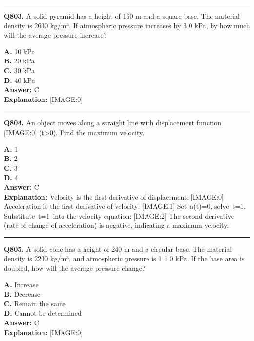 \documentclass[12pt]{article}
\begin{document}
\hrule
\vspace{1em}


\noindent
\textbf{Q803.} A solid pyramid has a height of 160 m and a square base. The material density is 2600 kg/m³. If atmospheric pressure increases by
3
0 kPa, by how much will the average pressure increase?



\textbf{A.} 10 kPa \\
\textbf{B.} 20 kPa \\
\textbf{C.} 30 kPa \\
\textbf{D.} 40 kPa \\

\textbf{Answer:} C \\
\textbf{Explanation:} [IMAGE:0]

\hrule
\vspace{1em}


\noindent
\textbf{Q804.} An object moves along a straight line with displacement function
[IMAGE:0]
(t>0). Find the maximum velocity.



\textbf{A.} 1 \\
\textbf{B.} 2 \\
\textbf{C.} 3 \\
\textbf{D.} 4 \\

\textbf{Answer:} C \\
\textbf{Explanation:} Velocity is the first derivative of displacement:
[IMAGE:0]
Acceleration is the first derivative of velocity:
[IMAGE:1]
Set a(t)=0, solve t=1. Substitute t=1 into the velocity equation:
[IMAGE:2]
The second derivative (rate of change of acceleration) is negative, indicating a maximum velocity.

\hrule
\vspace{1em}


\noindent
\textbf{Q805.} A solid cone has a height of 240 m and a circular base. The material density is 2200 kg/m³, and atmospheric pressure is 1
1
0 kPa. If the base area is doubled, how will the average pressure change?



\textbf{A.} Increase \\
\textbf{B.} Decrease \\
\textbf{C.} Remain the same \\
\textbf{D.} Cannot be determined \\

\textbf{Answer:} C \\
\textbf{Explanation:} [IMAGE:0]
\end{document}
